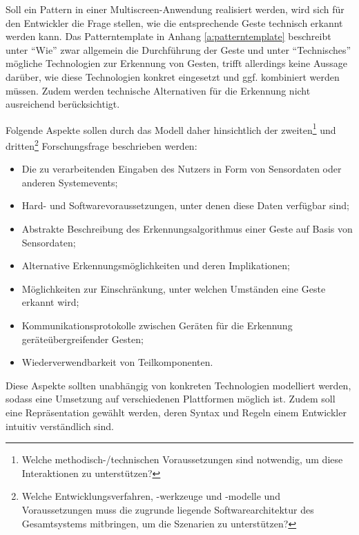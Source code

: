 Soll ein Pattern in einer Multiscreen-Anwendung realisiert werden, wird sich für den Entwickler die Frage stellen, wie die entsprechende Geste technisch erkannt werden kann. Das Patterntemplate in Anhang \ref{a:patterntemplate} beschreibt unter "`Wie"' zwar allgemein die Durchführung der Geste und unter "`Technisches"' mögliche Technologien zur Erkennung von Gesten, trifft allerdings keine Aussage darüber, wie diese Technologien konkret eingesetzt und ggf. kombiniert werden müssen. Zudem werden technische Alternativen für die Erkennung nicht ausreichend berücksichtigt.

Folgende Aspekte sollen durch das Modell daher hinsichtlich der zweiten\footnote{Welche methodisch-/technischen Voraussetzungen sind notwendig, um diese Interaktionen zu unterstützen?} und dritten\footnote{Welche Entwicklungsverfahren, -werkzeuge und -modelle und Voraussetzungen muss die zugrunde liegende Softwarearchitektur des Gesamtsystems mitbringen, um die Szenarien zu unterstützen?} Forschungsfrage beschrieben werden:
\begin{itemize}
\item Die zu verarbeitenden Eingaben des Nutzers in Form von Sensordaten oder anderen Systemevents;
\item Hard- und Softwarevoraussetzungen, unter denen diese Daten verfügbar sind;
\item Abstrakte Beschreibung des Erkennungsalgorithmus einer Geste auf Basis von Sensordaten;
\item Alternative Erkennungsmöglichkeiten und deren Implikationen;
\item Möglichkeiten zur Einschränkung, unter welchen Umständen eine Geste erkannt wird;
\item Kommunikationsprotokolle zwischen Geräten für die Erkennung geräteübergreifender Gesten;
\item Wiederverwendbarkeit von Teilkomponenten.
\end{itemize}
Diese Aspekte sollten unabhängig von konkreten Technologien modelliert werden, sodass eine Umsetzung auf verschiedenen Plattformen möglich ist. Zudem soll eine Repräsentation gewählt werden, deren Syntax und Regeln einem Entwickler intuitiv verständlich sind.

